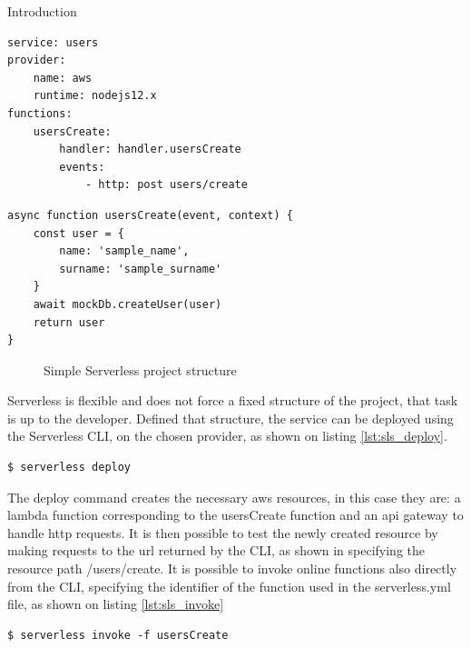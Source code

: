\begin{chapter}{Introduction}

    \begin{lstlisting}[caption=Simple serverless.yml file, label={lst:simple_sls_yml}]
service: users
provider:
    name: aws
    runtime: nodejs12.x
functions:
    usersCreate:
        handler: handler.usersCreate
        events:
            - http: post users/create
    \end{lstlisting}

    \begin{lstlisting}[caption=Simple handler function, label={lst:handler_fun}]
async function usersCreate(event, context) {
    const user = {
        name: 'sample_name',
        surname: 'sample_surname'
    }
    await mockDb.createUser(user)
    return user
}
    \end{lstlisting}


    \begin{figure}
        \caption{Simple Serverless project structure}
        \label{fig:sls_project_structure}
        \begin{minipage}{\linewidth}
        \end{minipage}
    \end{figure}

    Serverless is flexible and does not force a fixed structure of the project, that
    task is up to the developer.
    Defined that structure, the service can be deployed using the Serverless CLI, on
    the chosen provider, as shown on listing \ref{lst:sls_deploy}.
    \begin{lstlisting}[caption=Deploy command, label={lst:sls_deploy}]
$ serverless deploy
    \end{lstlisting}
    The deploy command creates the necessary aws resources, in this case they are:
    a lambda function corresponding to the usersCreate function and an api gateway to
    handle http requests.
    It is then possible to test the newly created resource by making requests to the
    url returned by the CLI, as shown in %
    specifying the resource path /users/create.
    It is possible to invoke online functions also directly from the CLI,
    specifying the identifier of the function used in the serverless.yml file, as shown
    on listing \ref{lst:sls_invoke}
    \begin{lstlisting}[caption=Invoke command, label={lst:sls_invoke}]
$ serverless invoke -f usersCreate
    \end{lstlisting}


\end{chapter}
